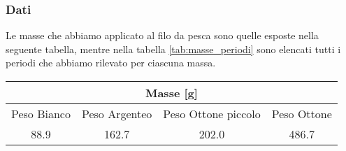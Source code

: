 \subsubsection{Dati}

Le masse che abbiamo applicato al filo da pesca sono quelle esposte nella seguente tabella,
mentre nella tabella \ref{tab:masse_periodi} sono elencati tutti i periodi che abbiamo rilevato per ciascuna massa.

\begin{center}
	\begin{tabular}{c c c c}
			\multicolumn{4}{c}{\textbf{Masse [g]}} \\
	        \toprule
	        Peso Bianco & Peso Argenteo & Peso Ottone piccolo & Peso Ottone \\
	        \midrule
	        88.9 & 162.7 & 202.0 & 486.7 \\ 
	        \bottomrule
	\end{tabular}
\end{center}

